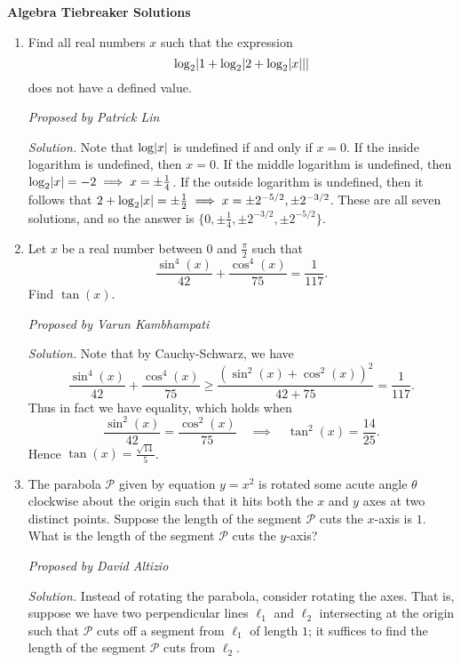 \documentclass[10pt]{article}
\newcounter{enum}
\newcommand{\proposed}[1]
{
\vspace{5pt}
\noindent\textit{Proposed by #1}
}
\newcommand{\solution}
{
\vspace{5pt}
\noindent\textit{Solution.}\qquad
}
\DeclarePairedDelimiter\abs{\lvert}{\rvert}
\begin{document}
\begin{center}
\huge\textbf{Algebra Tiebreaker Solutions}
\end{center}

\begin{enumerate}

\item Find all real numbers $x$ such that the expression
\[\log_2 \abs{1 + \log_2 \abs{2 + \log_2 \abs{x}}}\]
does not have a defined value.

\proposed{Patrick Lin}

\solution Note that $\log\abs{x}$ is undefined if and only if $x = 0$. If the inside logarithm is undefined, then $x = 0$. If the middle logarithm is undefined, then $\log_2\abs{x} = -2 \implies x = \pm \frac14$. If the outside logarithm is undefined, then it follows that $2 + \log_2\abs{x} = \pm \frac12 \implies x = \pm 2^{-5/2}, \pm 2^{-3/2}$. These are all seven solutions, and so the answer is $\boxed{\{0, \pm \tfrac14, \pm 2^{-3/2}, \pm 2^{-5/2}\}}$.

\item Let $x$ be a real number between $0$ and $\tfrac{\pi}2$ such that \[\dfrac{\sin^4(x)}{42}+\dfrac{\cos^4(x)}{75} = \dfrac{1}{117}.\] Find $\tan(x)$.

\proposed{Varun Kambhampati}

\solution Note that by Cauchy-Schwarz, we have \[\dfrac{\sin^4(x)}{42}+\dfrac{\cos^4(x)}{75}\geq\dfrac{(\sin^2(x)+\cos^2(x))^2}{42+75} = \dfrac{1}{117}.\] Thus in fact we have equality, which holds when \[\dfrac{\sin^2(x)}{42} = \dfrac{\cos^2(x)}{75}\quad\implies\quad\tan^2(x) = \frac{14}{25}.\] Hence $\tan(x) = \boxed{\tfrac{\sqrt{14}}5}$.

\item The parabola $\mathcal P$ given by equation $y=x^2$ is rotated some acute angle $\theta$ clockwise about the origin such that it hits both the $x$ and $y$ axes at two distinct points.  Suppose the length of the segment $\mathcal P$ cuts the $x$-axis is $1$.  What is the length of the segment $\mathcal P$ cuts the $y$-axis?

\proposed{David Altizio}

\solution Instead of rotating the parabola, consider rotating the axes.  That is, suppose we have two perpendicular lines $\ell_1$ and $\ell_2$ intersecting at the origin such that $\mathcal P$ cuts off a segment from $\ell_1$ of length $1$; it suffices to find the length of the segment $\mathcal P$ cuts from $\ell_2$.


\end{enumerate}
\end{document}

